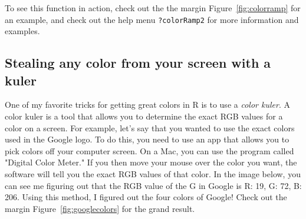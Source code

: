 \documentclass{tufte-book}\usepackage[]{graphicx}\usepackage[]{color}
\begin{document}
To see this function in action, check out the the margin Figure~\ref{fig:colorramp} for an example, and check out the help menu \texttt{?colorRamp2} for more information and examples.

\subsection{Stealing any color from your screen with a kuler}

One of my favorite tricks for getting great colors in R is to use a \textit{color kuler}. A color kuler is a tool that allows you to determine the exact RGB values for a color on a screen. For example, let's say that you wanted to use the exact colors used in the Google logo. To do this, you need to use an app that allows you to pick colors off your computer screen. On a Mac, you can use the program called "Digital Color Meter." If you then move your mouse over the color you want, the software will tell you the exact RGB values of that color. In the image below, you can see me figuring out that the RGB value of the G in Google is R: 19, G: 72, B: 206. Using this method, I figured out the four colors of Google! Check out the margin Figure~\ref{fig:googlecolors} for the grand result.
\end{document}
